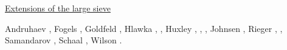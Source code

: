 \medskip 
\begin{center} 
\underline{Extensions of the large sieve} 
\end{center}


Andruhaev \cite{key1}, Fogels \cite{key1}, Goldfeld \cite{key3},
Hlawka \cite{key1}, \cite{key2}, Huxley \cite{key1}, \cite{key3},
\cite{key4}, Johnsen \cite{key1}, Rieger \cite{key1}, \cite{key2},
Samandarov \cite{key1}, Schaal \cite{key1}, Wilson \cite{key1}.

